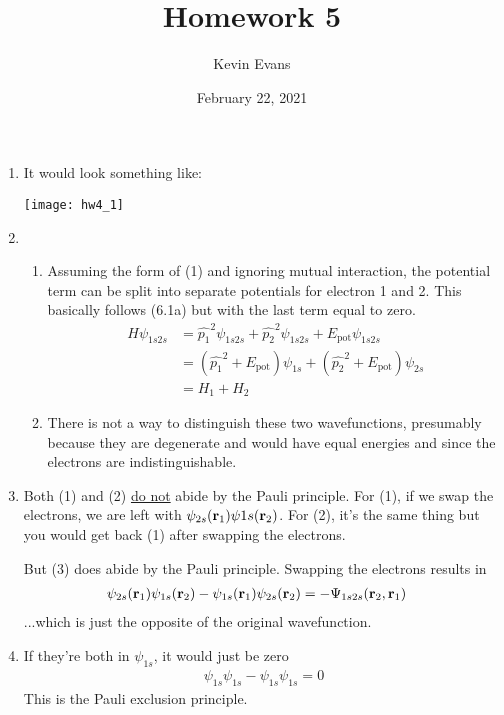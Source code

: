 \documentclass{homework}
\title{Homework 5}
\author{Kevin Evans}
\date{February 22, 2021}
\begin{document}
	\maketitle
	\begin{enumerate}
		\item It would look something like:
		
		\texttt{[image: hw4\_1]}
		
		
		\item \begin{enumerate}
			\item Assuming the form of (1) and ignoring mutual interaction, the potential term can be split into separate potentials for electron 1 and 2. This basically follows (6.1a) but with the last term equal to zero. \begin{align*}
				 H \psi_{1s2s} & = \hat{p_1}^2 \psi_{1s2s} + \hat{p_2}^2 \psi_{1s2s} + E_\mathrm{pot}\psi_{1s2s} \\
				& = \left(\hat{p_1}^2 + E_\mathrm{pot} \right)\psi_{1s}
				+ \left(\hat{p_2}^2 + E_\mathrm{pot} \right)\psi_{2s} \\
				& = H_1 + H_2
			\end{align*}
		
			\item There is not a way to distinguish these two wavefunctions, presumably because they are degenerate and would have equal energies and since the electrons are indistinguishable.
		\end{enumerate}
		
		\item Both (1) and (2) \underline{do not} abide by the Pauli principle. For (1), if we swap the electrons, we are left with $\psi_{2s}(\boldsymbol{\mathrm{r}}_1)\psi{1s}(\boldsymbol{\mathrm{r}}_2)$. For (2), it's the same thing but you would get back (1) after swapping the electrons.
		
		But (3) does abide by the Pauli principle. Swapping the electrons results in \begin{align*}
			\psi_{2s}(\boldsymbol{\mathrm{r}}_1) \psi_{1s}(\boldsymbol{\mathrm{r}}_2) - \psi_{1s}(\boldsymbol{\mathrm{r}}_1)\psi_{2s}(\boldsymbol{\mathrm{r}}_2) & = -\Psi_{1s2s}(\boldsymbol{\mathrm{r}}_2, \boldsymbol{\mathrm{r}}_1)
		\end{align*}
		...which is just the opposite of the original wavefunction.
		
		
		\item If they're both in $\psi_{1s}$, it would just be zero \begin{align*}
			\psi_{1s} \psi_{1s} - \psi_{1s} \psi_{1s} = 0
		\end{align*}
		This is the Pauli exclusion principle. 
		

\end{enumerate}
\end{document}
